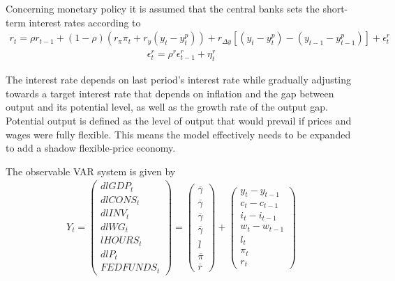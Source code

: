 \documentclass{beamer}
\begin{document}
\begin{frame}
 Concerning monetary policy it is assumed that the central banks sets the short-term interest rates according to
\begin{align*}
  r_t = \rho r_{t-1} + (1-\rho)(r_\pi \pi_t + r_y(y_t - y_t^p)) + r_{\Delta y} [(y_t - y_t^p) - (y_{t-1} - y_{t-1}^p)] + \epsilon_t^r 
\end{align*}
\begin{align*}  \epsilon_t^r = \rho^r \epsilon^r_{t-1} + \eta_t^r \end{align*}

The interest rate depends on last period's interest rate while gradually adjusting towards a target interest rate that depends on inflation and the gap between output and its potential level, as well as the growth rate of the output gap.
Potential output is defined as the level of output that would prevail if prices and wages were fully flexible. This means the model effectively needs to be expanded to add a shadow flexible-price economy.
\end{frame}

\begin{frame}
The observable VAR system is given by
\begin{align*}
  Y_t = \begin{pmatrix}
    dlGDP_t \\ dlCONS_t \\ dlINV_t \\ dlWG_t \\ lHOURS_t \\ dlP_t \\ FEDFUNDS_t
  \end{pmatrix} =
  \begin{pmatrix}
    \overline{\gamma} \\ \overline{\gamma} \\ \overline{\gamma} \\ \overline{\gamma} \\ \overline{l} \\ \overline{\pi} \\ \overline{r}
  \end{pmatrix} +
  \begin{pmatrix}
    y_t-y_{t-1} \\c_t-c_{t-1} \\ i_t-i_{t-1} \\ w_t-w_{t-1} \\ l_t \\ \pi_t \\ r_t
  \end{pmatrix}  
\end{align*}

\end{frame}
\end{document}

